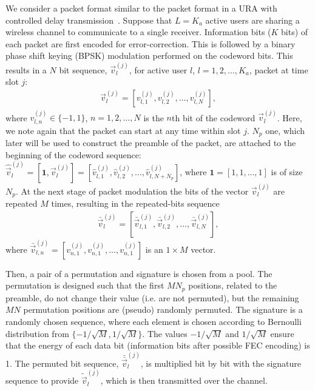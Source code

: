 \documentclass[journal,onecolumn,12pt]{IEEEtran}
\begin{document}
  We consider a packet format similar to the packet format in a URA with controlled delay transmission~\cite{TBKN20}. Suppose that $L=K_a$ active users are sharing a wireless channel to communicate to a single receiver. Information bits ($K$ bits) of each packet are first encoded for error-correction. This is followed by a binary phase shift keying (BPSK) modulation performed on the codeword bits. This results in a $N$ bit sequence, $\vec{v}_l^{(j)}$, for active user $l$, $l=1,2,\dots, K_a$, packet at time slot $j$:
\begin{align}
	\vec{v}_l^{(j)} = [v_{l,1}^{(j)}, v_{l,2}^{(j)}, \dots, v_{l,N}^{(j)}],
\end{align}
where $v_{l,n}^{(j)} \in \{-1,1\}$, $n=1, 2, \dots, N$ is the $n$th bit of the codeword $\vec{v}_l^{(j)}$. Here, we note again that the packet can start at any time within slot $j$. $N_p$ one, which later will be used to construct the preamble of the packet, are attached to the beginning of the codeword sequence: $ \hat{\vec{v}}_l^{(j)}=[\mathbf{1}, \vec{v}_l^{(j)}]= [\hat{v}_{l,1}^{(j)}, \hat{v}_{l,2}^{(j)}, \dots, \hat{v}_{l,N+N_p}^{(j)}]$, where $\mathbf{1}=[1, 1,\dots, 1]$ is of size $N_p$.
At the next stage of packet modulation the bits of the vector $\vec{v}_l^{(j)}$ are repeated $M$ times, resulting in the repeated-bits sequence
\begin{align}
\bar{\vec{v}}_l^{(j)} = [\bar{\vec{v}}_{l,1}^{(j)}, \bar{\vec{v}}_{l,2}^{(j)}, \dots, \bar{\vec{v}}_{l,N}^{(j)}],
\end{align}
where $\bar{\vec{v}}_{l,n}^{(j)}= [v_{n,1}^{(j)}, v_{n,1}^{(j)}, \dots, v_{n,1}^{(j)}]$ is an $1 \times M$ vector.

Then, a pair of a permutation and signature is chosen from a pool. The permutation is designed such that the first $MN_p$ positions, related to the preamble, do not change their value (i.e. are not permuted), but the remaining $MN$ permutation positions are (pseudo) randomly permuted. The signature is a randomly chosen sequence, where each element is chosen according to Bernoulli distribution from $\{-1/\sqrt{M}, 1/\sqrt{M}\}$. The values $-1/\sqrt{M}$ and $1/\sqrt{M}$ ensure that the energy of each data bit (information bits after possible FEC encoding) is 1. The permuted bit sequence, $\bar{\bar{\vec{v}}}_{l}^{(j)}$, is multiplied bit by bit with the signature sequence to provide $\tilde{\vec{v}}_{l}^{(j)}$, which is then transmitted over the channel. %
\end{document}
